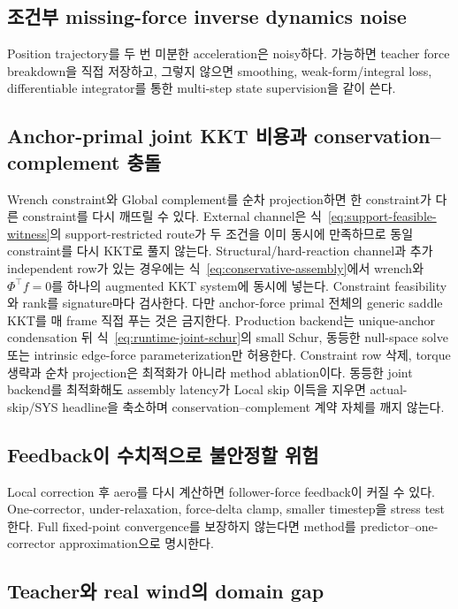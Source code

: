 \documentclass[11pt,a4paper]{article}
\begin{document}
\subsection{조건부 missing-force inverse dynamics noise}

Position trajectory를 두 번 미분한 acceleration은 noisy하다.
가능하면 teacher force breakdown을 직접 저장하고,
그렇지 않으면 smoothing, weak-form/integral loss,
differentiable integrator를 통한 multi-step state supervision을 같이 쓴다.

\subsection{Anchor-primal joint KKT 비용과 conservation--complement 충돌}

Wrench constraint와 Global complement를 순차 projection하면
한 constraint가 다른 constraint를 다시 깨뜨릴 수 있다.
External channel은 식~\eqref{eq:support-feasible-witness}의 support-restricted route가
두 조건을 이미 동시에 만족하므로 동일 constraint를 다시 KKT로 풀지 않는다.
Structural/hard-reaction channel과 추가 independent row가 있는 경우에는
식~\eqref{eq:conservative-assembly}에서 wrench와 \(\Phi^\top f=0\)를 하나의 augmented
KKT system에 동시에 넣는다. Constraint feasibility와 rank를 signature마다 검사한다.
다만 anchor-force primal 전체의 generic saddle KKT를 매 frame 직접 푸는 것은 금지한다.
Production backend는 unique-anchor condensation 뒤 식~\eqref{eq:runtime-joint-schur}의
small Schur, 동등한 null-space solve 또는 intrinsic edge-force parameterization만 허용한다.
Constraint row 삭제, torque 생략과 순차 projection은 최적화가 아니라 method ablation이다.
동등한 joint backend를 최적화해도 assembly latency가 Local skip 이득을 지우면
actual-skip/SYS headline을 축소하며 conservation--complement 계약 자체를 깨지 않는다.

\subsection{Feedback이 수치적으로 불안정할 위험}

Local correction 후 aero를 다시 계산하면 follower-force feedback이 커질 수 있다.
One-corrector, under-relaxation, force-delta clamp,
smaller timestep을 stress test한다.
Full fixed-point convergence를 보장하지 않는다면
method를 predictor--one-corrector approximation으로 명시한다.

\subsection{Teacher와 real wind의 domain gap}
\end{document}

